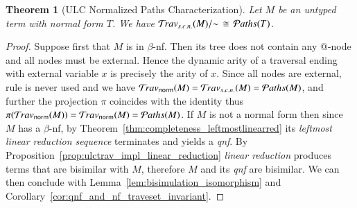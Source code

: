 \documentclass{elsarticle}
\theoremstyle{plain}
\newtheorem{theorem}{Theorem}[section]
\theoremstyle{definition}
\newcommand{\normalizing}{{\sf norm}}
\newcommand{\travsetnorm}{\travset_\normalizing} %
\newcommand{\travsetscn}{\travset_{s.c.n.}} %
\def\structisomorphic{\cong} %
\def\coresymbol{\pi} %
\newcommand{\core}[1]{\coresymbol(#1)} %
\newcommand\pathset{{\mathcal{P}aths}} %
\begin{document}


\begin{theorem}[ULC Normalized Paths Characterization]
\label{thm:path_charact_ulc}
Let $M$ be an untyped term with normal form $T$. We have
$\travsetscn(M)/{\sim} \, \structisomorphic\, \pathset(T)$.
\end{theorem}
\begin{proof}
Suppose first that $M$ is in $\beta$-nf. Then its tree does not contain any $@$-node and all nodes must be external.
Hence the dynamic arity of a traversal ending with external variable $x$ is precisely the arity of $x$. Since all nodes are external,
rule  is never used and we have
$\travsetnorm(M) = \travsetscn(M) = \pathset(M)$, and further
the projection $\coresymbol$ coincides with the identity thus $\core{\travsetnorm(M)} = \travsetnorm(M) = \pathset(M)$.
%
If $M$ is not a normal form then since $M$ has a $\beta$-nf, by Theorem~\ref{thm:completeness_leftmostlinearred} its \emph{leftmost linear reduction sequence} terminates and yields a \emph{qnf}.
By Proposition~\ref{prop:ulctrav_impl_linear_reduction}
\emph{linear reduction} produces terms that are bisimilar with $M$,
therefore $M$ and its \emph{qnf} are bisimilar.
We can then conclude with Lemma~\ref{lem:bisimulation_isomorphism}
and Corollary~\ref{cor:qnf_and_nf_traveset_invariant}.
\end{proof}
\end{document}
